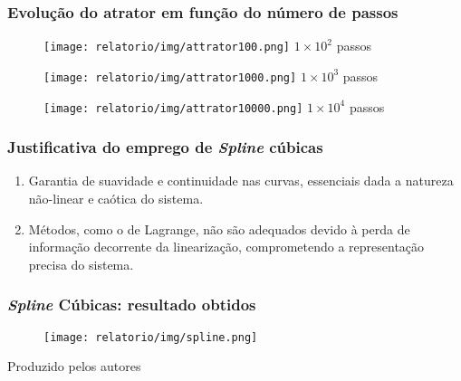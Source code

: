 
\begin{frame}
    \frametitle{Evolução do atrator em função do número de passos}
    \begin{figure}[htbp]
        \centering
        \begin{minipage}{0.32\textwidth}
            \centering
            \texttt{[image: relatorio/img/attrator100.png]}
            \vspace{0.5em} %
            {\scriptsize $1 \times 10^2$ passos}
        \end{minipage}\hfill
        \begin{minipage}{0.32\textwidth}
            \centering
            \texttt{[image: relatorio/img/attrator1000.png]}
            \vspace{0.5em} %
            {\scriptsize $1 \times 10^3$ passos}
        \end{minipage}\hfill
        \begin{minipage}{0.32\textwidth}
            \centering
            \texttt{[image: relatorio/img/attrator10000.png]}
            \vspace{0.5em} %
            {\scriptsize $1 \times 10^4$ passos}
        \end{minipage}
    \end{figure}
\end{frame}



\begin{frame}
    \frametitle{Justificativa do emprego de \textit{Spline} cúbicas}
    \begin{enumerate}
        \item Garantia de suavidade e continuidade nas curvas, essenciais dada a natureza não-linear e caótica do sistema. 
        \item Métodos, como o de Lagrange, não são adequados devido à perda de informação decorrente da linearização, comprometendo a representação precisa do sistema.
    \end{enumerate}
\end{frame}


\begin{frame}
    \frametitle{\textit{Spline} Cúbicas: resultado obtidos}      
    
    \begin{figure}
        \centering
        \texttt{[image: relatorio/img/spline.png]}
    \end{figure}

    \vspace{0.2cm}

    \begin{center}
        {\tiny Produzido pelos autores}
    \end{center}
    
\end{frame}

